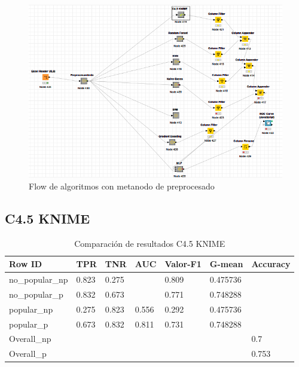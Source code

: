\begin{figure}[H] %
	\centering
	\includegraphics[scale=0.6]{flow-completo.png}  %
	\caption{Flow de algoritmos con metanodo de preprocesado} 
	\label{fig:flow-completo}
\end{figure}

\subsection{C4.5 KNIME}


\begin{table}[H]
	\centering
	\begin{tabular}{|l|l|l|l|l|l|l|}
		\hline
		Row ID          & TPR   & TNR   & AUC   & Valor-F1 & G-mean   & Accuracy \\ \hline
		no\_popular\_np & 0.823 & 0.275 &       & 0.809    & 0.475736 &          \\ \hline
		no\_popular\_p  & 0.832 & 0.673 &       & 0.771    & 0.748288 &          \\ \hline
		popular\_np     & 0.275 & 0.823 & 0.556 & 0.292    & 0.475736 &          \\ \hline
		popular\_p      & 0.673 & 0.832 & 0.811 & 0.731    & 0.748288 &          \\ \hline
		Overall\_np     &       &       &       &          &          & 0.7      \\ \hline
		Overall\_p      &       &       &       &          &          & 0.753    \\ \hline
	\end{tabular}
	\caption{Comparación de resultados C4.5 KNIME}
	\label{tab:compc4.5}
\end{table}

